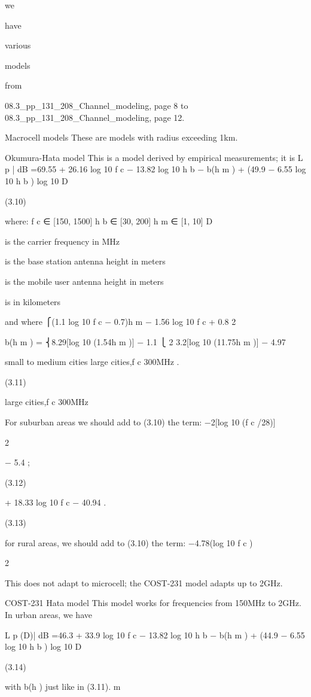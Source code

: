 {{{we

have

various

models

from

08.3_pp_131_208_Channel_modeling, page 8 to 08.3_pp_131_208_Channel_modeling,
page 12.

Macrocell models These are models with radius exceeding 1km.

Okumura-Hata model This is a model derived by empirical measurements; it is L p | dB =69.55 + 26.16 log 10 f c − 13.82 log 10 h b − b(h m )
+ (49.9 − 6.55 log 10 h b ) log 10 D

(3.10)

where:
f c ∈ [150, 1500]
h b ∈ [30, 200]
h m ∈ [1, 10]
D

is the carrier frequency in MHz

is the base station antenna height in meters

is the mobile user antenna height in meters

is in kilometers

and where
⎧(1.1 log 10 f c − 0.7)h m − 1.56 log 10 f c + 0.8 2

b(h m ) = ⎨8.29[log 10 (1.54h m )] − 1.1
⎩
2 3.2[log 10 (11.75h m )] − 4.97

small to medium cities large cities,f c \leq 300MHz .

(3.11)

large cities,f c \geq 300MHz

For suburban areas we should add to (3.10) the term:
−2[log 10 (f c /28)]

2

− 5.4 ;

(3.12)

+ 18.33 log 10 f c − 40.94 .

(3.13)

for rural areas, we should add to (3.10) the term:
−4.78(log 10 f c )

2

This does not adapt to microcell; the COST-231 model adapts up to 2GHz.

COST-231 Hata model This model works for frequencies from 150MHz to 2GHz. In urban areas, we have

L p (D)| dB =46.3 + 33.9 log 10 f c − 13.82 log 10 h b − b(h m )
+ (44.9 − 6.55 log 10 h b ) log 10 D

(3.14)

with b(h ) just like in (3.11).
m

}}}
